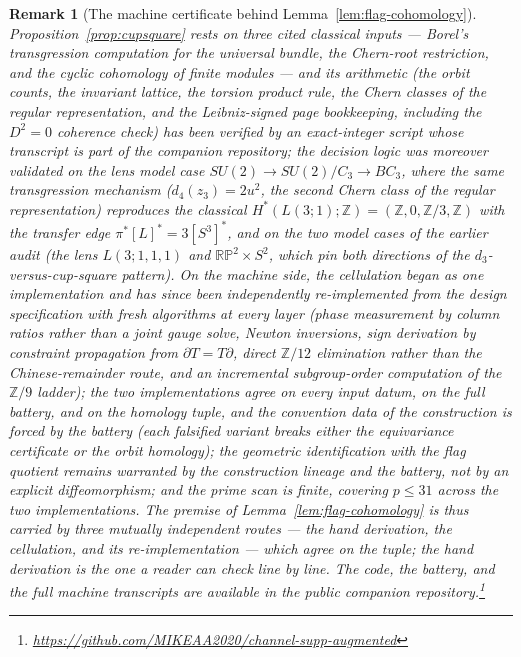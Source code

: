 \documentclass[11pt,a4paper]{article}
\newtheorem{remark}[theorem]{Remark}
\begin{document}
\begin{remark}[The machine certificate behind Lemma~\ref{lem:flag-cohomology}]
Proposition~\ref{prop:cupsquare} rests on three cited classical inputs ---
Borel's transgression computation for the universal bundle, the Chern-root
restriction, and the cyclic cohomology of finite modules --- and its
arithmetic (the orbit counts, the invariant lattice, the torsion product
rule, the Chern classes of the regular representation, and the
Leibniz-signed page bookkeeping, including the $D^2=0$ coherence check) has
been verified by an exact-integer script whose transcript is part of the
companion repository; the decision logic was moreover validated on the lens
model case $SU(2)\to SU(2)/C_3\to BC_3$, where the same transgression
mechanism ($d_4(z_3)=2u^2$, the second Chern class of the regular
representation) reproduces the classical $H^*(L(3;1);\mathbb Z)=
(\mathbb Z,0,\mathbb Z/3,\mathbb Z)$ with the transfer edge
$\pi^*[L]^*=3[S^3]^*$, and on the two model cases of the earlier audit
(the lens $L(3;1,1,1)$ and $\mathbb{RP}^2\times S^2$, which pin both
directions of the $d_3$-versus-cup-square pattern). On the machine side, the
cellulation began as one
implementation and has since been independently re-implemented from the
design specification with fresh algorithms at every layer (phase measurement
by column ratios rather than a joint gauge solve, Newton inversions, sign
derivation by constraint propagation from $\partial T=T\partial$, direct
$\mathbb Z/12$ elimination rather than the Chinese-remainder route, and an
incremental subgroup-order computation of the $\mathbb Z/9$ ladder); the two
implementations agree on every input datum, on the full battery, and on the
homology tuple, and the convention data of the construction is forced by the
battery (each falsified variant breaks either the equivariance certificate
or the orbit homology); the geometric identification with the flag quotient
remains warranted by the construction lineage and the battery, not by an
explicit diffeomorphism; and the prime scan is finite, covering $p\le 31$
across the two implementations. The premise of
Lemma~\ref{lem:flag-cohomology} is thus carried by three mutually
independent routes --- the hand derivation, the cellulation, and its
re-implementation --- which agree on the tuple; the hand derivation is the
one a reader can check line by line. The code, the battery,
and the full machine transcripts are available in the public companion
repository.\footnote{\url{https://github.com/MIKEAA2020/channel-supp-augmented}}
\end{remark}
\end{document}
